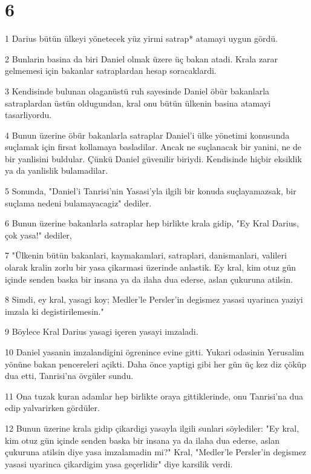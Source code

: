 \chapter{6}

\par 1 Darius bütün ülkeyi yönetecek yüz yirmi satrap* atamayi uygun gördü.
\par 2 Bunlarin basina da biri Daniel olmak üzere üç bakan atadi. Krala zarar gelmemesi için bakanlar satraplardan hesap soracaklardi.
\par 3 Kendisinde bulunan olaganüstü ruh sayesinde Daniel öbür bakanlarla satraplardan üstün oldugundan, kral onu bütün ülkenin basina atamayi tasarliyordu.
\par 4 Bunun üzerine öbür bakanlarla satraplar Daniel'i ülke yönetimi konusunda suçlamak için firsat kollamaya basladilar. Ancak ne suçlanacak bir yanini, ne de bir yanlisini buldular. Çünkü Daniel güvenilir biriydi. Kendisinde hiçbir eksiklik ya da yanlislik bulamadilar.
\par 5 Sonunda, "Daniel'i Tanrisi'nin Yasasi'yla ilgili bir konuda suçlayamazsak, bir suçlama nedeni bulamayacagiz" dediler.
\par 6 Bunun üzerine bakanlarla satraplar hep birlikte krala gidip, "Ey Kral Darius, çok yasa!" dediler,
\par 7 "Ülkenin bütün bakanlari, kaymakamlari, satraplari, danismanlari, valileri olarak kralin zorlu bir yasa çikarmasi üzerinde anlastik. Ey kral, kim otuz gün içinde senden baska bir insana ya da ilaha dua ederse, aslan çukuruna atilsin.
\par 8 Simdi, ey kral, yasagi koy; Medler'le Persler'in degismez yasasi uyarinca yaziyi imzala ki degistirilemesin."
\par 9 Böylece Kral Darius yasagi içeren yasayi imzaladi.
\par 10 Daniel yasanin imzalandigini ögrenince evine gitti. Yukari odasinin Yerusalim yönüne bakan pencereleri açikti. Daha önce yaptigi gibi her gün üç kez diz çöküp dua etti, Tanrisi'na övgüler sundu.
\par 11 Ona tuzak kuran adamlar hep birlikte oraya gittiklerinde, onu Tanrisi'na dua edip yalvarirken gördüler.
\par 12 Bunun üzerine krala gidip çikardigi yasayla ilgili sunlari söylediler: "Ey kral, kim otuz gün içinde senden baska bir insana ya da ilaha dua ederse, aslan çukuruna atilsin diye yasa imzalamadin mi?" Kral, "Medler'le Persler'in degismez yasasi uyarinca çikardigim yasa geçerlidir" diye karsilik verdi.
